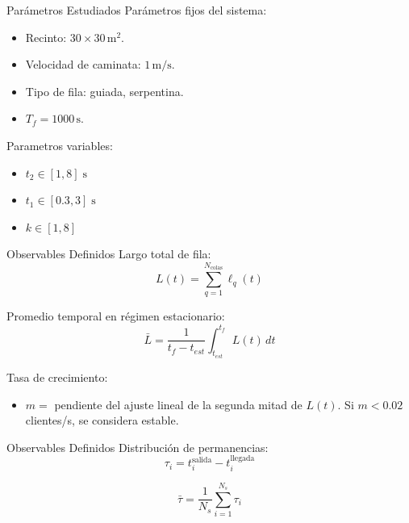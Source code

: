 \documentclass{beamer}
\newcommand{\paramsbox}[1]{%
    \begin{beamercolorbox}[sep=5pt,center]{block body}
        \small #1
    \end{beamercolorbox}
}
\begin{document}
\begin{frame}{Par\'ametros Estudiados}
    Par\'ametros fijos del sistema:
    \begin{itemize}
        \item Recinto: $30 \times 30\,\mathrm{m}^2$.
        \item Velocidad de caminata: $1\,\mathrm{m/s}$.
        \item Tipo de fila: guiada, serpentina.
        \item $T_f = 1000\,\mathrm{s}$.
    \end{itemize}

    Parametros variables:
    \begin{itemize}
        \item $t_2 \in [1, 8] \;\mathrm{s}$
        \item $t_1 \in [0.3, 3] \;\mathrm{s}$
        \item $k \in [1, 8]$
    \end{itemize}
\end{frame}

\begin{frame}{Observables Definidos}
    Largo total de fila:
    \begin{equation*}
        L(t) = \sum_{q=1}^{N_{\text{colas}}} \ell_q(t)
    \end{equation*}

    Promedio temporal en r\'egimen estacionario:
    \begin{equation*}
        \bar{L} = \frac{1}{t_f-t_{est}} \int_{t_{est}}^{t_f} L(t) \, dt
    \end{equation*}

    Tasa de crecimiento:
    \begin{itemize}
    \item $m =$ pendiente del ajuste lineal de la segunda mitad de $L(t)$. Si $m < 0.02$ clientes/s, se considera estable.
    \end{itemize}

\end{frame}

\begin{frame}{Observables Definidos}
    Distribuci\'on de permanencias:
    \begin{equation*}
        \tau_i = t_i^{\text{salida}} - t_i^{\text{llegada}}
    \end{equation*}

    \begin{equation*}
        \bar{\tau} = \frac{1}{N_s} \sum_{i=1}^{N_s} \tau_i
    \end{equation*}

\end{frame}
\end{document}

